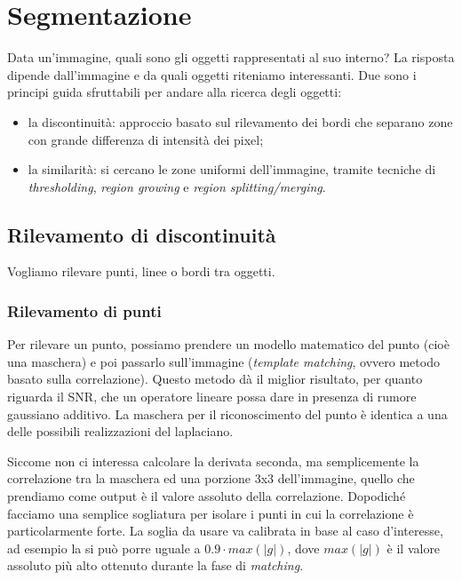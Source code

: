 \documentclass[a4paper,11pt]{article}
\begin{document}
\section{Segmentazione}
Data un'immagine, quali sono gli oggetti rappresentati al suo interno? La risposta dipende dall'immagine e da quali
oggetti riteniamo interessanti. Due sono i principi guida sfruttabili per andare alla ricerca degli oggetti:
\begin{itemize}
    \item la discontinuità: approccio basato sul rilevamento dei bordi che separano zone con grande differenza di intensità dei pixel;
    \item la similarità: si cercano le zone uniformi dell'immagine, tramite tecniche di \textit{thresholding}, \textit{region growing} e
    \textit{region splitting/merging}.
\end{itemize}

\subsection{Rilevamento di discontinuità}
Vogliamo rilevare punti, linee o bordi tra oggetti.
\subsubsection{Rilevamento di punti}
Per rilevare un punto, possiamo prendere un modello matematico del punto (cioè una maschera) e poi passarlo sull'immagine (\textit{template matching},
ovvero metodo basato sulla correlazione). Questo metodo dà il miglior risultato, per quanto riguarda il SNR, che un operatore lineare possa dare in presenza
di rumore gaussiano additivo. La maschera per il riconoscimento del punto è identica a una delle possibili realizzazioni del laplaciano.

\begin{center}
\end{center}

Siccome non ci interessa calcolare la derivata seconda, ma semplicemente la correlazione tra la maschera ed una porzione 3x3 dell'immagine,
quello che prendiamo come output è il valore assoluto della correlazione. Dopodiché facciamo una semplice sogliatura per isolare i punti
in cui la correlazione è particolarmente forte. La soglia da usare va calibrata in base al caso d'interesse, ad esempio la si può porre uguale a
$0.9 \cdot max(|g|)$, dove $max(|g|)$ è il valore assoluto più alto ottenuto durante la fase di \textit{matching}.
\end{document}
